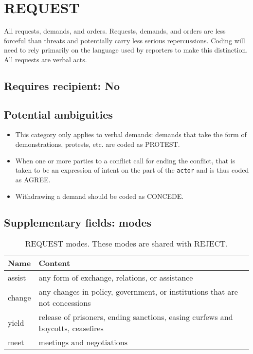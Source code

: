 \documentclass[11pt]{report}
\newcommand{\plcat}[1]{\textsf{#1}}
\newcommand{\txt}[1]{\texttt{#1}}
\begin{document}
\newpage

\section{REQUEST}

All requests, demands, and orders. Requests, demands, and orders are less forceful than threats and potentially carry less serious repercussions. Coding will need to rely primarily on the language used by reporters to make this distinction. All requests are verbal acts.

\subsection{Requires recipient: No}


\subsection{Potential ambiguities}

\begin{itemize}
\item This category only applies to verbal demands: demands that take the form of demonstrations, protests, etc. are coded as \plcat{PROTEST}.
\item When one or more parties to a conflict call for ending the conflict, that is taken to be an expression of intent on the part of the \txt{actor} and is thus coded as \plcat{AGREE}.
\item Withdrawing a demand should be coded as \plcat{CONCEDE}.

\end{itemize}


\subsection{Supplementary fields: modes}


\begin{table}[htp]
\caption{REQUEST modes. These modes are shared with REJECT.}
\begin{center}
\begin{tabular}{|l|p{13cm}|}
\hline
Name & Content \\
\hline
assist & any form of exchange, relations, or assistance\\
change & any changes in policy, government, or institutions that are not concessions \\
yield & release of prisoners, ending sanctions, easing curfews and boycotts, ceasefires\\
meet & meetings and negotiations\\
\hline
\end{tabular}
\end{center}
\label{tab:requestmode2}
\end{table}%
\end{document}
